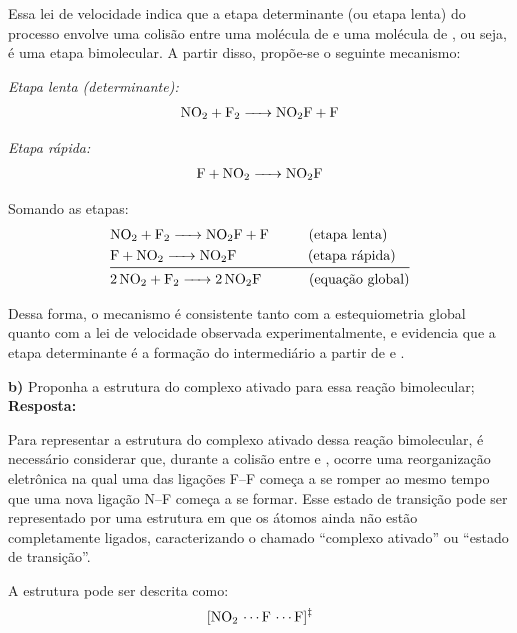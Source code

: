 Essa lei de velocidade indica que a etapa determinante (ou etapa lenta) do processo envolve uma colisão entre uma molécula de  e uma molécula de , ou seja, é uma etapa bimolecular. A partir disso, propõe-se o seguinte mecanismo:

\textit{Etapa lenta (determinante):}
\begin{align*}
\ce{NO2 + F2 -> NO2F + F}
\end{align*}

\textit{Etapa rápida:}
\begin{align*}
\ce{F + NO2 -> NO2F}
\end{align*}

Somando as etapas:
\begin{align*}
&\ce{NO2 + F2 -> NO2F + F} \hspace{1.0cm} \text{(etapa lenta)}\\
&\ce{F + NO2 -> NO2F} \hspace{1.8cm} \text{(etapa rápida)}\\
\midrule %
&\ce{2NO2 + F2 -> 2NO2F} \hspace{1.2cm} \text{(equação global)}
\end{align*}

Dessa forma, o mecanismo é consistente tanto com a estequiometria global quanto com a lei de velocidade observada experimentalmente, e evidencia que a etapa determinante é a formação do intermediário a partir de  e .

\commentspace

\textbf{b)} Proponha a estrutura do complexo ativado para essa reação bimolecular;\\

\textbf{Resposta:} 

Para representar a estrutura do complexo ativado dessa reação bimolecular, é necessário considerar que, durante a colisão entre  e , ocorre uma reorganização eletrônica na qual uma das ligações F–F começa a se romper ao mesmo tempo que uma nova ligação N–F começa a se formar. Esse estado de transição pode ser representado por uma estrutura em que os átomos ainda não estão completamente ligados, caracterizando o chamado “complexo ativado” ou “estado de transição”.

A estrutura pode ser descrita como:
\begin{align*}
\ce{[NO2 \cdots F \cdots F]^{\ddagger}}
\end{align*}

